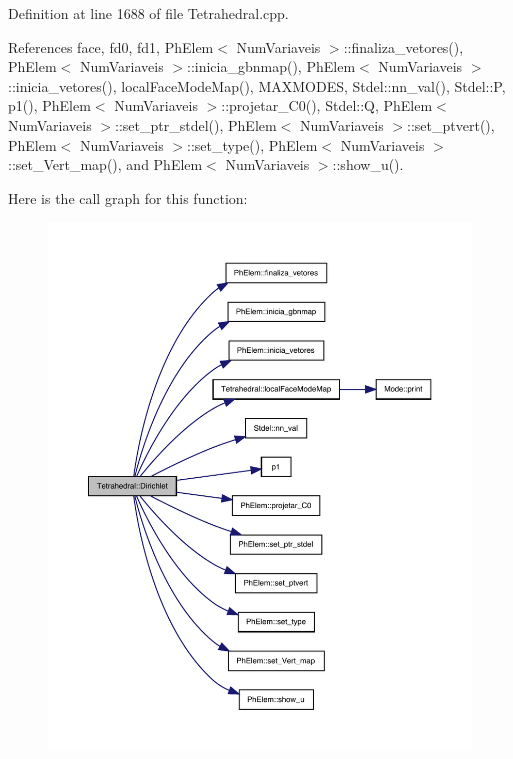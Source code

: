 Definition at line 1688 of file Tetrahedral.\+cpp.



References face, fd0, fd1, Ph\+Elem$<$ Num\+Variaveis $>$\+::finaliza\+\_\+vetores(), Ph\+Elem$<$ Num\+Variaveis $>$\+::inicia\+\_\+gbnmap(), Ph\+Elem$<$ Num\+Variaveis $>$\+::inicia\+\_\+vetores(), local\+Face\+Mode\+Map(), M\+A\+X\+M\+O\+D\+ES, Stdel\+::nn\+\_\+val(), Stdel\+::P, p1(), Ph\+Elem$<$ Num\+Variaveis $>$\+::projetar\+\_\+\+C0(), Stdel\+::Q, Ph\+Elem$<$ Num\+Variaveis $>$\+::set\+\_\+ptr\+\_\+stdel(), Ph\+Elem$<$ Num\+Variaveis $>$\+::set\+\_\+ptvert(), Ph\+Elem$<$ Num\+Variaveis $>$\+::set\+\_\+type(), Ph\+Elem$<$ Num\+Variaveis $>$\+::set\+\_\+\+Vert\+\_\+map(), and Ph\+Elem$<$ Num\+Variaveis $>$\+::show\+\_\+u().

Here is the call graph for this function\+:
\nopagebreak
\begin{figure}[H]
\begin{center}
\leavevmode
\includegraphics[width=350pt]{classTetrahedral_afa5ab92fac0ada8385fddf3ddec3a8fc_cgraph}
\end{center}
\end{figure}
\mbox{\label{classStdel_a922b779be1f8f12b7a5535ab529bff64}} 
